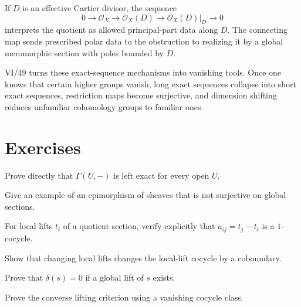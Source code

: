 \begin{example}\label{ex:vi48-principal-parts}
If $D$ is an effective Cartier divisor, the sequence
\[
0\to\mathcal O_X\to\mathcal O_X(D)\to\mathcal O_X(D)|_D\to0
\]
interprets the quotient as allowed principal-part data along $D$.  The connecting map sends prescribed polar data to the obstruction to realizing it by a global meromorphic section with poles bounded by $D$.
\end{example}

\begin{remark}[Bridge to VI/49]\label{remark:vi48-next}
VI/49 turns these exact-sequence mechanisms into vanishing tools.  Once one knows that certain higher groups vanish, long exact sequences collapse into short exact sequences, restriction maps become surjective, and dimension shifting reduces unfamiliar cohomology groups to familiar ones.
\end{remark}

\section{Exercises}
\begin{exercise}\label{exr:vi48-01}
Prove directly that $\Gamma(U,-)$ is left exact for every open $U$.
\end{exercise}

\begin{exercise}\label{exr:vi48-02}
Give an example of an epimorphism of sheaves that is not surjective on global sections.
\end{exercise}

\begin{exercise}\label{exr:vi48-03}
For local lifts $t_i$ of a quotient section, verify explicitly that $a_{ij}=t_j-t_i$ is a $1$-cocycle.
\end{exercise}

\begin{exercise}\label{exr:vi48-04}
Show that changing local lifts changes the local-lift cocycle by a coboundary.
\end{exercise}

\begin{exercise}\label{exr:vi48-05}
Prove that $\delta(s)=0$ if a global lift of $s$ exists.
\end{exercise}

\begin{exercise}\label{exr:vi48-06}
Prove the converse lifting criterion using a vanishing cocycle class.
\end{exercise}

